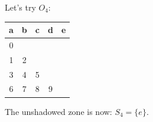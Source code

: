 		\noindent
		Let's try $O_{4}$:\\
		\begin{table}[h!]
			\begin{center}
				\begin{tabular}{|c|c|c|c|c|}
					\hline
					\cellcolor{myblue} a & 
					\cellcolor{myblue} b &
					\cellcolor{myblue} c &
					\cellcolor{myblue} d &
					\cellcolor{bosunired!50} e \\
					\hline
					\cellcolor{applegreen!50} 0 &
					\multicolumn{4}{|c|}{} \\
					\hline
					\cellcolor{applegreen!50} 1 &
					\cellcolor{applegreen!50} 2 &
					\multicolumn{3}{|c|}{} \\
					\hline
					\cellcolor{applegreen!50} 3 &
					\cellcolor{applegreen!50} 4 &
					\cellcolor{applegreen!50} 5 &
					\multicolumn{2}{|c|}{} \\
					\hline
					\cellcolor{applegreen!50} 6 &
					\cellcolor{applegreen!50} 7 &
					\cellcolor{applegreen!50} 8 &
					\cellcolor{applegreen!50} 9 &
					\:\: \\
					\hline
				\end{tabular}
			\end{center}
		\end{table}
		
		\noindent
		The unshadowed zone is now: $S_{4} = \{e\}$.
		\\\\
		
